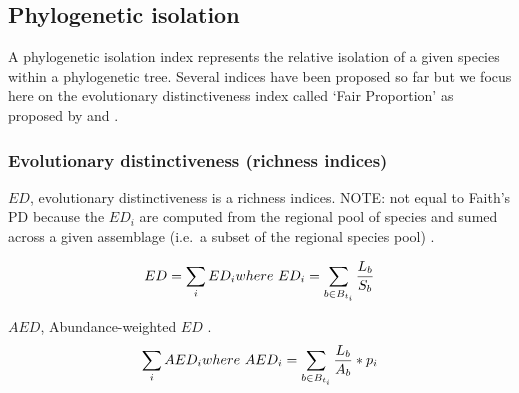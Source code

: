 \documentclass[]{book}
\theoremstyle{definition}
\theoremstyle{definition}
\theoremstyle{remark}
\begin{document}
\hypertarget{phylogenetic-isolation}{\subsection{Phylogenetic
isolation}\label{phylogenetic-isolation}}

A phylogenetic isolation index represents the relative isolation of a
given species within a phylogenetic tree. Several indices have been
proposed so far but we focus here on the evolutionary distinctiveness
index called `Fair Proportion' as proposed by \citet{Redding2003} and
\citet{Isaac2007}.

\subsubsection{Evolutionary distinctiveness (richness
indices)}\label{evolutionary-distinctiveness-richness-indices}

\(ED\), evolutionary distinctiveness is a richness indices. NOTE: not
equal to Faith's PD because the \(ED_{i}\) are computed from the
regional pool of species and sumed across a given assemblage (i.e.~a
subset of the regional species pool)
\citep{Tucker2016, Safi2013a, Redding2003, Isaac2007}.

\[
  ED = \sum_{i}ED_{i} \\
  \ \\ 
  where \ ED_{i} = \sum_{b \in B_{t_{i}}} \dfrac{L_{b}}{S_{b}} 
\]

\(AED\), Abundance-weighted \(ED\) \citep{Tucker2016, Cadotte2010}. \[
\sum_{i} AED_{i} \\
\ \\
where \ AED_{i} = \sum_{b \in B_{t_{i}}} \dfrac{L_{b}}{A_{b} }* p_{i}
\]
\end{document}
